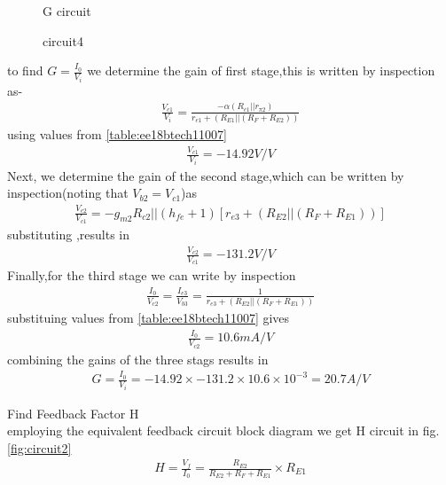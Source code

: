 \begin{enumerate}[label=\thesubsection.\arabic*.,ref=\thesubsection.\theenumi]
{\begin{figure}[!ht]
\begin{center}
		\resizebox{\columnwidth}{!}{}
	\end{center}
\caption{G circuit}
\label{fig:circuit3}
\end{figure}
\begin{figure}[!ht]
	\begin{center}
		
		\resizebox{\columnwidth}{!}{}
	\end{center}
\caption{circuit4}
\label{fig:circuit4}
\end{figure}
to find $G=\frac{I_0}{V_i}$ we determine the gain of first stage,this is written by inspection as-
\begin{align}
    \frac{V_{c1}}{V_i}=\frac{-\alpha(R_{c1}||r_{\pi2})}{r_{e1}+(R_{E1}||(R_F+R_{E2}))}
\end{align}
using values from \ref{table:ee18btech11007}
\begin{align}
\frac{V_{c1}}{V_i}=-14.92V/V     
\end{align}
Next, we determine the gain of the second stage,which can be written by inspection(noting that $V_{b2}=V_{c1}$)as
\begin{align}
    \frac{V_{c2}}{V_{c1}}=-g_{m2}{R_{c2}||(h_{fe}+1)[r_{e3}+(R_{E2}||(R_F+R_{E1}))]}
\end{align}
substituting ,results in 
\begin{align}
    \frac{V_{c2}}{V_{c1}}=-131.2 V/V
\end{align}
Finally,for the third stage we can write by inspection
\begin{align}
    \frac{I_0}{V_{c2}}=\frac{I_{e3}}{V_{b3}}=\frac{1}{r_{e3}+(R_{E2}||(R_F+R_{E1}))}
\end{align}
substituing values from \ref{table:ee18btech11007} gives
\begin{align}
    \frac{I_0}{V_{c2}}=10.6mA/V
\end{align}
combining the gains of the three stags results in
\begin{align}
G=\frac{I_0}{V_i}=-14.92\times-131.2\times10.6\times10^{-3}=20.7A/V    
\end{align}
\item Find Feedback Factor H
\\
\solution employing  the equivalent feedback circuit block diagram we get H circuit  in  fig.\ref{fig:circuit2} 
\begin{align}
    H=\frac{V_f}{I_0}=\frac{R_{E2}}{R_{E2}+R_F+R_{E1}} \times R_{E1}
\end{align}
}
\end{enumerate}
